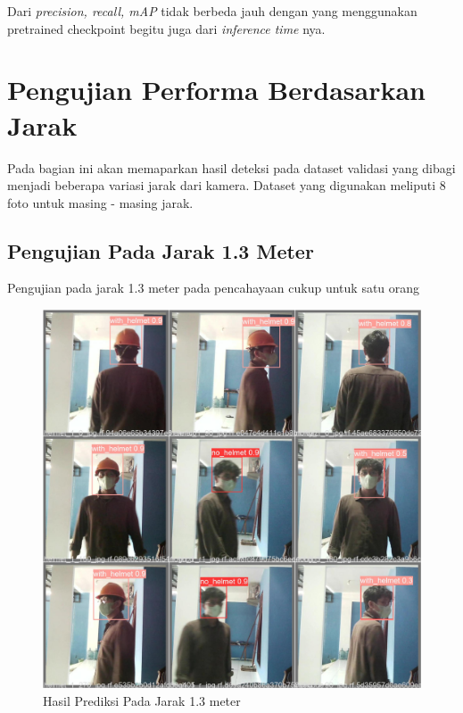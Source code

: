 Dari \emph{precision, recall, mAP} tidak berbeda jauh dengan yang menggunakan pretrained checkpoint begitu juga dari \emph{inference time} nya.

\section{Pengujian Performa Berdasarkan Jarak}
\label{sec:ujiberdasarkanjarak}

Pada bagian ini akan memaparkan hasil deteksi pada dataset validasi yang dibagi menjadi beberapa variasi jarak dari kamera. Dataset yang digunakan meliputi 8 foto untuk masing - masing jarak.

\subsection{Pengujian Pada Jarak 1.3 Meter}
\label{subsec:ujijarak1_3meter}

\par Pengujian pada jarak 1.3 meter pada pencahayaan cukup untuk satu orang

\begin{figure}[ht]
  \centering
  \includegraphics[scale=0.1]{gambar/BerdasarkanJarak/Jarak1_3/val_batch0_pred.jpg}
  \caption{Hasil Prediksi Pada Jarak 1.3 meter}
\end{figure}

